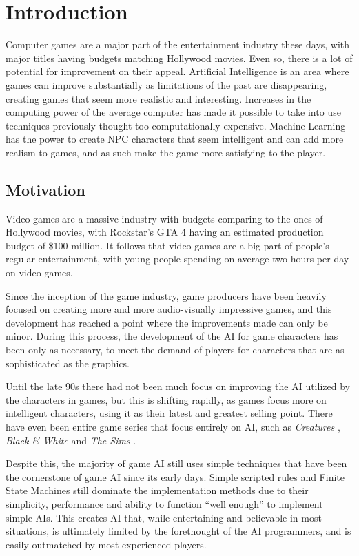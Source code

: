 \cleardoublepage
\chapter{Introduction}
\label{intro} Computer games are a major part of the entertainment industry
these days, with major titles having budgets matching Hollywood movies. Even so,
there is a lot of potential for improvement on their appeal. Artificial
Intelligence is an area where games can improve substantially as limitations of
the past are disappearing, creating games that seem more realistic and
interesting. Increases in the computing power of the average computer has made
it possible to take into use techniques previously thought too computationally
expensive. Machine Learning has the power to create NPC characters that seem
intelligent and can add more realism to games, and as such make the game more
satisfying to the player.

\section{Motivation}
\label{sec:motivation}

Video games are a massive industry with budgets comparing to the ones of
Hollywood movies, with Rockstar's GTA 4 having an estimated production budget of
\$100 million. It follows that video games are a big part of people's regular
entertainment, with young people spending on average two hours per day on video
games. \citep{norway08:video_games}

Since the inception of the game industry, game producers have been heavily
focused on creating more and more audio-visually impressive games, and this
development has reached a point where the improvements made can only be
minor. During this process, the development of the AI for game characters has
been only as necessary, to meet the demand of players for characters that are as
sophisticated as the graphics. \citep{champandard2003ai}

Until the late 90s there had not been much focus on improving the AI utilized by
the characters in games\cite{tozour2002evolution}, but this is shifting rapidly,
as games focus more on intelligent characters, using it as their latest and
greatest selling point. There have even been entire game series that focus
entirely on AI, such as \emph{Creatures} \citep{grand1997creatures}, \emph{Black
  \& White} \citep{lionhead01:black_white} and \emph{The Sims}
\citep{maxis00:sims}.

Despite this, the majority of game AI still uses simple techniques that have
been the cornerstone of game AI since its early days. Simple scripted rules and
Finite State Machines still dominate the implementation methods due to their
simplicity, performance and ability to function ``well enough'' to implement
simple AIs. \citep{woodcock2001game} This creates AI that, while entertaining
and believable in most situations, is ultimately limited by the forethought of
the AI programmers, and is easily outmatched by most experienced players.

